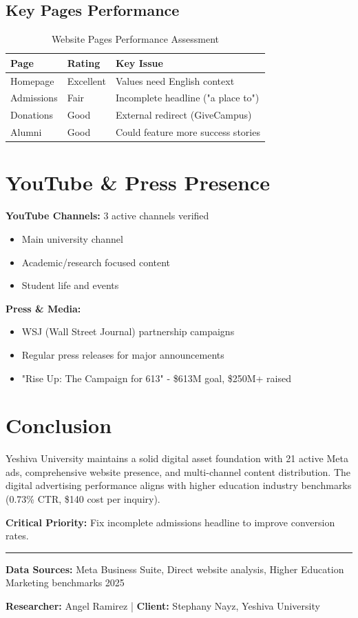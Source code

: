 \documentclass[12pt,letterpaper]{article}
\begin{document}
\subsection{Key Pages Performance}

\begin{table}[h]
\centering
\begin{tabular}{@{}lll@{}}
\toprule
\textbf{Page} & \textbf{Rating} & \textbf{Key Issue} \\
\midrule
Homepage & Excellent & Values need English context \\
Admissions & Fair & Incomplete headline ("a place to") \\
Donations & Good & External redirect (GiveCampus) \\
Alumni & Good & Could feature more success stories \\
\bottomrule
\end{tabular}
\caption{Website Pages Performance Assessment}
\end{table}

\section{YouTube \& Press Presence}

\textbf{YouTube Channels:} 3 active channels verified
\begin{itemize}[leftmargin=*]
    \item Main university channel
    \item Academic/research focused content
    \item Student life and events
\end{itemize}

\textbf{Press \& Media:}
\begin{itemize}[leftmargin=*]
    \item WSJ (Wall Street Journal) partnership campaigns
    \item Regular press releases for major announcements
    \item "Rise Up: The Campaign for 613" - \$613M goal, \$250M+ raised
\end{itemize}

\section{Conclusion}

Yeshiva University maintains a solid digital asset foundation with 21 active Meta ads, comprehensive website presence, and multi-channel content distribution. The digital advertising performance aligns with higher education industry benchmarks (0.73\% CTR, \$140 cost per inquiry).

\textbf{Critical Priority:} Fix incomplete admissions headline to improve conversion rates.

\vspace{0.5cm}

\noindent\rule{\textwidth}{0.4pt}

\textbf{Data Sources:} Meta Business Suite, Direct website analysis, Higher Education Marketing benchmarks 2025

\textbf{Researcher:} Angel Ramirez | \textbf{Client:} Stephany Nayz, Yeshiva University
\end{document}

